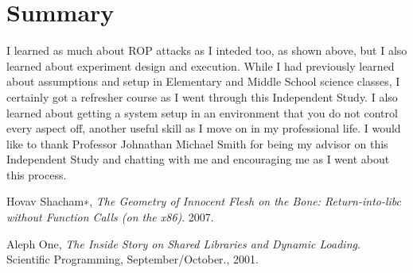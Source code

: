 \documentclass[11pt]{amsart}
\begin{document}
\section*{Summary}
I learned as much about ROP attacks as I inteded too, as shown above, but I also learned about experiment design and execution. While I had previously learned about assumptions and setup in Elementary and Middle School science classes, I certainly got a refresher course as I went through this Independent Study. I also learned about getting a system setup in an environment that you do not control every aspect off, another useful skill as I move on in my professional life.
I would like to thank Professor Johnathan Michael Smith for being my advisor on this Independent Study and chatting with me and encouraging me as I went about this process.

\begin{thebibliography}{1}

  Hovav Shacham∗,
  \emph{The Geometry of Innocent Flesh on the Bone: Return-into-libc without Function Calls (on the x86)}.
  2007.

  Aleph One,
  \emph{The Inside Story on Shared Libraries and Dynamic Loading}.
  Scientific Programming, September/October.,
  2001.

\end{thebibliography}
\end{document}
